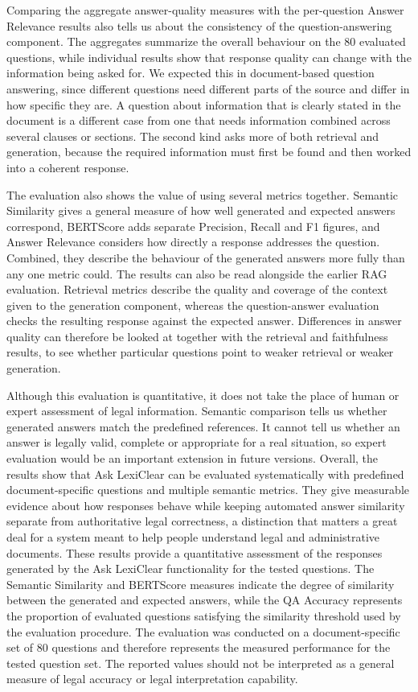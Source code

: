 \documentclass[12pt,a4paper,oneside]{report}
\begin{document}
Comparing the aggregate answer-quality measures with the per-question Answer Relevance results also tells us about the consistency of the question-answering component. The aggregates summarize the overall behaviour on the 80 evaluated questions, while individual results show that response quality can change with the information being asked for. We expected this in document-based question answering, since different questions need different parts of the source and differ in how specific they are. A question about information that is clearly stated in the document is a different case from one that needs information combined across several clauses or sections. The second kind asks more of both retrieval and generation, because the required information must first be found and then worked into a coherent response.

The evaluation also shows the value of using several metrics together. Semantic Similarity gives a general measure of how well generated and expected answers correspond, BERTScore adds separate Precision, Recall and F1 figures, and Answer Relevance considers how directly a response addresses the question. Combined, they describe the behaviour of the generated answers more fully than any one metric could. The results can also be read alongside the earlier RAG evaluation. Retrieval metrics describe the quality and coverage of the context given to the generation component, whereas the question-answer evaluation checks the resulting response against the expected answer. Differences in answer quality can therefore be looked at together with the retrieval and faithfulness results, to see whether particular questions point to weaker retrieval or weaker generation.

Although this evaluation is quantitative, it does not take the place of human or expert assessment of legal information. Semantic comparison tells us whether generated answers match the predefined references. It cannot tell us whether an answer is legally valid, complete or appropriate for a real situation, so expert evaluation would be an important extension in future versions. Overall, the results show that Ask LexiClear can be evaluated systematically with predefined document-specific questions and multiple semantic metrics. They give measurable evidence about how responses behave while keeping automated answer similarity separate from authoritative legal correctness, a distinction that matters a great deal for a system meant to help people understand legal and administrative documents. These results provide a quantitative assessment of the responses generated by the Ask LexiClear functionality for the tested questions. The Semantic Similarity and BERTScore measures indicate the degree of similarity between the generated and expected answers, while the QA Accuracy represents the proportion of evaluated questions satisfying the similarity threshold used by the evaluation procedure. The evaluation was conducted on a document-specific set of 80 questions and therefore represents the measured performance for the tested question set. The reported values should not be interpreted as a general measure of legal accuracy or legal interpretation capability.
\end{document}

